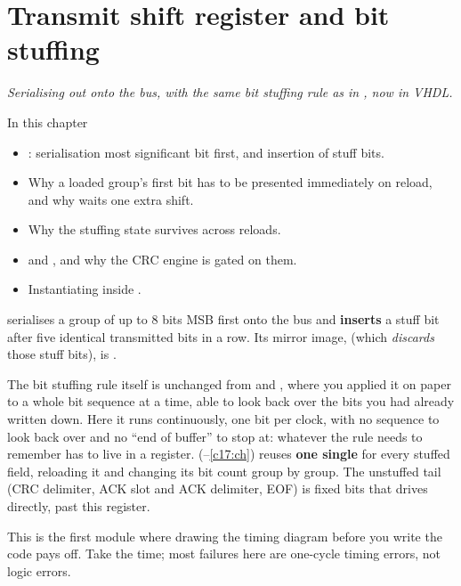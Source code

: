 
\chapter{Transmit shift register and bit stuffing}
\label{c14:ch}

{\large\itshape Serialising out onto the bus, with the same bit stuffing rule as in
, now in VHDL.\par}

\begin{chapterbox}{In this chapter}
\begin{itemize}
  \item {}: serialisation most significant bit first, and insertion of stuff bits.
  \item Why a loaded group's first bit has to be presented immediately on reload, and why 
    waits one extra shift.
  \item Why the stuffing state survives across reloads.
  \item {} and , and why the CRC engine is gated on them.
  \item Instantiating  inside .
\end{itemize}
\end{chapterbox}

 serialises a group of up to 8 bits MSB first onto the bus and \textbf{inserts} a
stuff bit after five identical transmitted bits in a row. Its mirror image, 
(which \emph{discards} those stuff bits), is .

The bit stuffing rule itself is unchanged from  and , where you
applied it on paper to a whole bit sequence at a time, able to look back over the bits you had
already written down. Here it runs continuously, one bit per clock, with no sequence to look back
over and no ``end of buffer'' to stop at: whatever the rule needs to remember has to live in a
register.  (--\ref{c17:ch}) reuses \textbf{one single}
 for every stuffed field, reloading it and changing its bit count group by group.
The unstuffed tail (CRC delimiter, ACK slot and ACK delimiter, EOF) is fixed bits that
 drives directly, past this register.

This is the first module where drawing the timing diagram before you write the code pays off. Take
the time; most failures here are one-cycle timing errors, not logic errors.




